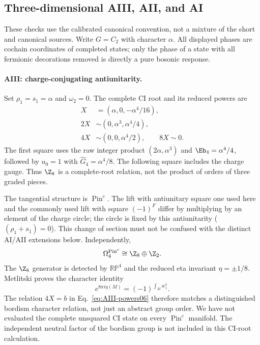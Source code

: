 \subsection{Three-dimensional AIII, AII, and AI}\label{app:3d-examples}
\label{sec:3d-bordism06}
These checks use the calibrated canonical convention, not a mixture of the short and canonical sources. Write $G=C_2$ with character $\alpha$. All displayed phases are cochain coordinates of completed states; only the phase of a state with all fermionic decorations removed is directly a pure bosonic response.

\paragraph{AIII: charge-conjugating antiunitarity.}
Set ${\rho_1}={s_1}=\alpha$ and $\omega_2=0$. The complete CI root and its reduced powers are
\begin{align}\label{eq:AIII-powers06}
 X&=(\alpha,0,-\alpha^4/16),\\
 2X&\sim(0,\alpha^3,\alpha^4/4),\\
 4X&\sim(0,0,\alpha^4/2),\qquad8X\sim0.
\end{align}
The first square uses the raw integer product $(2\alpha,\alpha^3)$ and $\Eb_4=\alpha^4/4$, followed by $u_0=1$ with $\widehat G_4=\alpha^4/8$. The following square includes the charge gauge. Thus $\Z_8$ is a complete-root relation, not the product of orders of three graded pieces.

The tangential structure is $\operatorname{Pin}^c$. The lift with antiunitary square one used here and the commonly used lift with square $(-1)^F$ differ by multiplying by an element of the charge circle; the circle is fixed by this antiunitarity ($(\rho_1+s_1)=0$). This change of section must not be confused with the distinct AI/AII extensions below. Independently,
\begin{equation}
           \Omega_4^{\operatorname{Pin}^c}\cong\Z_8\oplus\Z_2.
\end{equation}
The $\Z_8$ generator is detected by $\mathbb{RP}^4$ and the reduced eta invariant $\eta=\pm1/8$. Metlitski proves the character identity~\cite[Eq.~(74) and Sec.~VI]{Metlitski}
\begin{equation}\label{eq:AIII-eta06}
               e^{8\pi i\eta(M)}=(-1)^{\int_M w_1^4}.
\end{equation}
The relation $4X=b$ in Eq.~\eqref{eq:AIII-powers06} therefore matches a distinguished bordism character relation, not just an abstract group order. We have not evaluated the complete unsquared CI state on every $\operatorname{Pin}^c$ manifold. The independent neutral factor of the bordism group is not included in this CI-root calculation.


